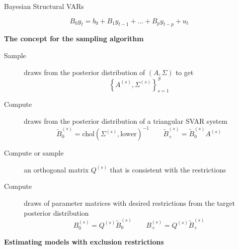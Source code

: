 \documentclass[notes,blackandwhite,mathsans,usenames,dvipsnames]{beamer}
\begin{document}
\begin{frame}{Bayesian Structural VARs}

$$ B_0y_t = b_0 + B_1y_{t-1}+ \dots + B_py_{t-p} + u_t $$

\bigskip\textbf{The concept for the sampling algorithm}
\begin{description}
\item[Sample] {\color{mcxs2}draws from the posterior distribution of} $(A,\Sigma)$ {\color{mcxs2}to get}
$$ \left\{A^{(s)},\Sigma^{(s)}\right\}_{s=1}^S $$
\item[Compute] {\color{mcxs2}draws from the posterior distribution of a triangular SVAR system}
$$ \tilde{B}_0^{(s)} = \text{chol}\left(\Sigma^{(s)}, \text{lower} \right)^{-1} \qquad
\tilde{B}_+^{(s)} = \tilde{B}_0^{(s)}A^{(s)} $$
\item[Compute or sample] {\color{mcxs2}an orthogonal matrix} $Q^{(s)}$ {\color{mcxs2}that is consistent with the restrictions}
\item[Compute] {\color{mcxs2}draws of parameter matrices with desired restrictions from the target posterior distribution}
$$ B_0^{(s)} = Q^{(s)}\tilde{B}_0^{(s)}  \qquad
B_+^{(s)} = Q^{(s)}\tilde{B}_+^{(s)}  $$
\end{description}

\end{frame}





%
%
%
%
%
%
%






{
\begin{frame}

\begin{adjustwidth}{-0.5cm}{0cm}
\vspace{8.3cm}\Large
\textbf{{\color{mcxs2}Estimating models with} {\color{mcxs1}exclusion restrictions}}
\end{adjustwidth}

\end{frame}
}
\end{document}

